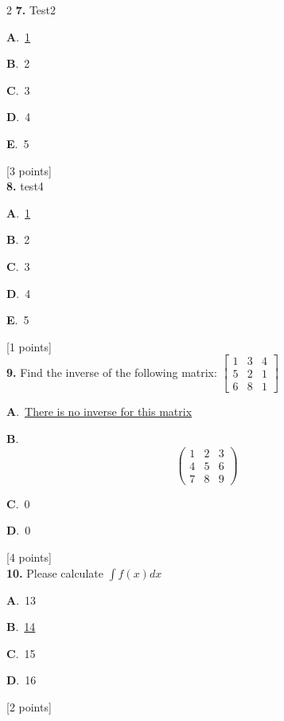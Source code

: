 \documentclass[12pt]{article}
\newcommand{\choice}[3]{%
  \noindent\textbf{#1}.~#2\hfill#3\par\vspace{0.25em}
}
\begin{document}
\begin{multicols}{2}
\noindent \textbf{\textenglish{7.}} {\textenglish{Test2}}

\noindent\choice{A}{\underline{{\textenglish{1}}}}{}
\noindent\choice{B}{{\textenglish{2}}}{}
\noindent\choice{C}{{\textenglish{3}}}{}
\noindent\choice{D}{{\textenglish{4}}}{}
\noindent\choice{E}{{\textenglish{5}}}{}
\hfill {\textenglish{[3 points]}}\\[0.5em]

\noindent \textbf{\textenglish{8.}} {\textenglish{test4}}

\noindent\choice{A}{\underline{{\textenglish{1}}}}{}
\noindent\choice{B}{{\textenglish{2}}}{}
\noindent\choice{C}{{\textenglish{3}}}{}
\noindent\choice{D}{{\textenglish{4}}}{}
\noindent\choice{E}{{\textenglish{5}}}{}
\hfill {\textenglish{[1 points]}}\\[0.5em]

\noindent \textbf{\textenglish{9.}} {\textenglish{Find the inverse of the following matrix: }}\(\begin{bmatrix} 1 & 3 & 4 \\ 5 & 2 & 1 \\ 6 & 8 & 1 \end{bmatrix}\)

\noindent\choice{A}{\underline{{\textenglish{There is no inverse for this matrix}}}}{}
\noindent\choice{B}{\[\begin{pmatrix} 1 & 2 & 3 \\ 4 & 5 & 6 \\ 7 & 8 & 9  \end{pmatrix}\]}{}
\noindent\choice{C}{{\textenglish{0}}}{}
\noindent\choice{D}{{\textenglish{0}}}{}
\hfill {\textenglish{[4 points]}}\\[0.5em]

\noindent \textbf{\textenglish{10.}} {\textenglish{Please calculate }}\(\int f(x)dx\)

\noindent\choice{A}{{\textenglish{13}}}{}
\noindent\choice{B}{\underline{{\textenglish{14}}}}{}
\noindent\choice{C}{{\textenglish{15}}}{}
\noindent\choice{D}{{\textenglish{16}}}{}
\hfill {\textenglish{[2 points]}}\\[0.5em]


\end{multicols}
\end{document}
